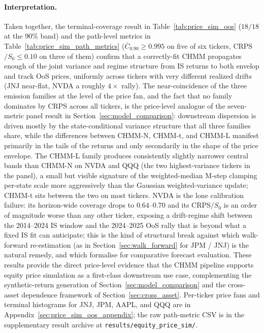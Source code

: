 \paragraph{Interpretation.}
Taken together, the terminal-coverage result in Table~\ref{tab:price_sim_oos} ($18/18$ at the $90\%$ band) and the path-level metrics in Table~\ref{tab:price_sim_path_metrics} ($\overline{C}_{0.90} \ge 0.995$ on five of six tickers, CRPS$/S_0 \le 0.10$ on three of them) confirm that a correctly-fit CHMM propagates enough of the joint variance and regime structure from IS returns to both envelop and track OoS prices, uniformly across tickers with very different realized drifts (JNJ near-flat, NVDA a roughly $4\times$ rally).
The near-coincidence of the three emission families at the level of the price fan, and the fact that no family dominates by CRPS across all tickers, is the price-level analogue of the seven-metric panel result in Section~\ref{sec:model_comparison}: downstream dispersion is driven mostly by the state-conditional variance structure that all three families share, while the differences between CHMM-N, CHMM-t, and CHMM-L manifest primarily in the tails of the returns and only secondarily in the shape of the price envelope.
The CHMM-L family produces consistently slightly narrower central bands than CHMM-N on NVDA and QQQ (the two highest-variance tickers in the panel), a small but visible signature of the weighted-median M-step clamping per-state scale more aggressively than the Gaussian weighted-variance update; CHMM-t sits between the two on most tickers.
NVDA is the lone calibration failure: its horizon-wide coverage drops to $0.64$--$0.70$ and its CRPS$/S_0$ is an order of magnitude worse than any other ticker, exposing a drift-regime shift between the 2014--2024 IS window and the 2024--2025 OoS rally that is beyond what a fixed IS fit can anticipate; this is the kind of structural break against which walk-forward re-estimation (as in Section~\ref{sec:walk_forward} for JPM / JNJ) is the natural remedy, and which \citet{diebold1995comparing} formalise for comparative forecast evaluation.
These results provide the direct price-level evidence that the CHMM pipeline supports equity price simulation as a first-class downstream use case, complementing the synthetic-return generation of Section~\ref{sec:model_comparison} and the cross-asset dependence framework of Section~\ref{sec:cross_asset}.
Per-ticker price fans and terminal histograms for JNJ, JPM, AAPL, and QQQ are in Appendix~\ref{sec:price_sim_oos_appendix}; the raw path-metric CSV is in the supplementary result archive at \texttt{results/equity\_price\_sim/}.


